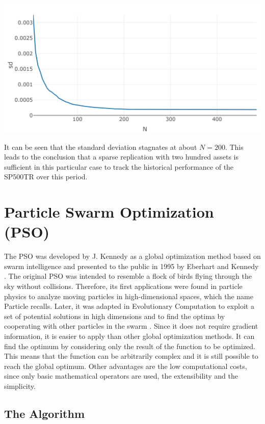 \documentclass[
  oneside]{book}
\begin{document}
\includegraphics{Master_Thesis_files/figure-latex/qp_itp4-1.png}

It can be seen that the standard deviation stagnates at about \(N=200\). This leads to the conclusion that a sparse replication with two hundred assets is sufficient in this particular case to track the historical performance of the SP500TR over this period.

\hypertarget{particle-swarm-optimization-pso}{%
\chapter{Particle Swarm Optimization (PSO)}\label{particle-swarm-optimization-pso}}

The PSO was developed by J. Kennedy as a global optimization method based on swarm intelligence and presented to the public in 1995 by Eberhart and Kennedy \citep{KeEb1995}. The original PSO was intended to resemble a flock of birds flying through the sky without collisions. Therefore, its first applications were found in particle physics to analyze moving particles in high-dimensional spaces, which the name Particle recalls. Later, it was adapted in Evolutionary Computation to exploit a set of potential solutions in high dimensions and to find the optima by cooperating with other particles in the swarm \citep{PaVr2002}. Since it does not require gradient information, it is easier to apply than other global optimization methods. It can find the optimum by considering only the result of the function to be optimized. This means that the function can be arbitrarily complex and it is still possible to reach the global optimum. Other advantages are the low computational costs, since only basic mathematical operators are used, the extensibility and the simplicity.

\hypertarget{the-algorithm}{%
\section{The Algorithm}\label{the-algorithm}}
\end{document}
